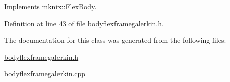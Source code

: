 Implements \hyperlink{classmknix_1_1_flex_body_a0058d01bf9b5b90b22a9f4d6ca0745de}{mknix\+::\+Flex\+Body}.



Definition at line 43 of file bodyflexframegalerkin.\+h.



The documentation for this class was generated from the following files\+:\begin{DoxyCompactItemize}
\item 
\hyperlink{bodyflexframegalerkin_8h}{bodyflexframegalerkin.\+h}\item 
\hyperlink{bodyflexframegalerkin_8cpp}{bodyflexframegalerkin.\+cpp}\end{DoxyCompactItemize}
